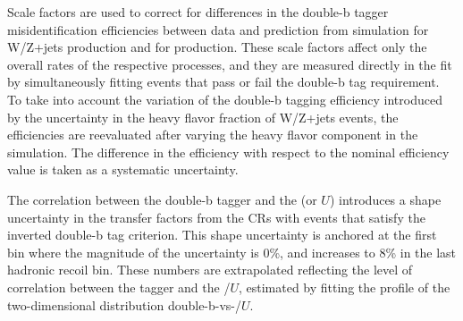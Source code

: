 Scale factors are used to correct for differences in the double-b tagger misidentification efficiencies between data and prediction from simulation for W/Z+jets production and for \ttbar production. These scale factors affect only the overall rates of the respective processes, and they are measured directly in the fit by simultaneously fitting events that pass or fail the double-b tag requirement.
%
To take into account the variation of the double-b tagging efficiency
introduced by the uncertainty in the heavy flavor fraction of W/Z+jets
events, the efficiencies are reevaluated after varying the heavy
flavor component in the simulation. The difference in the efficiency with respect to the nominal efficiency value is taken as a systematic uncertainty.
%

%
%
%
%
%
The correlation between the double-b tagger and the \ptmiss (or $U$) introduces a shape uncertainty in the transfer factors from the CRs with events that satisfy the inverted double-b tag criterion. This shape uncertainty is anchored at the first bin where the magnitude of the uncertainty is 0\%, and increases to 8\% in the last hadronic recoil bin. These numbers are extrapolated reflecting the level of correlation between the tagger and the \ptmiss/$U$, estimated by fitting the profile of the two-dimensional distribution double-b-vs-\ptmiss/$U$.
%

